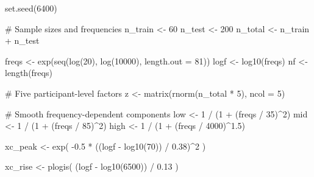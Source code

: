\documentclass[
  letterpaper,
  DIV=11,
  numbers=noendperiod]{scrreprt}
\newenvironment{Shaded}{\begin{snugshade}}{\end{snugshade}}
\newcommand{\AttributeTok}[1]{\textcolor[rgb]{0.40,0.45,0.13}{#1}}
\newcommand{\CommentTok}[1]{\textcolor[rgb]{0.37,0.37,0.37}{#1}}
\newcommand{\DecValTok}[1]{\textcolor[rgb]{0.68,0.00,0.00}{#1}}
\newcommand{\FloatTok}[1]{\textcolor[rgb]{0.68,0.00,0.00}{#1}}
\newcommand{\FunctionTok}[1]{\textcolor[rgb]{0.28,0.35,0.67}{#1}}
\newcommand{\NormalTok}[1]{\textcolor[rgb]{0.00,0.23,0.31}{#1}}
\newcommand{\OtherTok}[1]{\textcolor[rgb]{0.00,0.23,0.31}{#1}}
\newcommand{\SpecialCharTok}[1]{\textcolor[rgb]{0.37,0.37,0.37}{#1}}
\begin{document}
\begin{Shaded}
\begin{Highlighting}[]
\FunctionTok{set.seed}\NormalTok{(}\DecValTok{6400}\NormalTok{)}

\CommentTok{\# Sample sizes and frequencies}
\NormalTok{n\_train }\OtherTok{\textless{}{-}} \DecValTok{60}
\NormalTok{n\_test }\OtherTok{\textless{}{-}} \DecValTok{200}
\NormalTok{n\_total }\OtherTok{\textless{}{-}}\NormalTok{ n\_train }\SpecialCharTok{+}\NormalTok{ n\_test}

\NormalTok{freqs }\OtherTok{\textless{}{-}} \FunctionTok{exp}\NormalTok{(}\FunctionTok{seq}\NormalTok{(}\FunctionTok{log}\NormalTok{(}\DecValTok{20}\NormalTok{), }\FunctionTok{log}\NormalTok{(}\DecValTok{10000}\NormalTok{), }\AttributeTok{length.out =} \DecValTok{81}\NormalTok{))}
\NormalTok{logf }\OtherTok{\textless{}{-}} \FunctionTok{log10}\NormalTok{(freqs)}
\NormalTok{nf }\OtherTok{\textless{}{-}} \FunctionTok{length}\NormalTok{(freqs)}

\CommentTok{\# Five participant{-}level factors}
\NormalTok{z }\OtherTok{\textless{}{-}} \FunctionTok{matrix}\NormalTok{(}\FunctionTok{rnorm}\NormalTok{(n\_total }\SpecialCharTok{*} \DecValTok{5}\NormalTok{), }\AttributeTok{ncol =} \DecValTok{5}\NormalTok{)}

\CommentTok{\# Smooth frequency{-}dependent components}
\NormalTok{low }\OtherTok{\textless{}{-}} \DecValTok{1} \SpecialCharTok{/}\NormalTok{ (}\DecValTok{1} \SpecialCharTok{+}\NormalTok{ (freqs }\SpecialCharTok{/} \DecValTok{35}\NormalTok{)}\SpecialCharTok{\^{}}\DecValTok{2}\NormalTok{)}
\NormalTok{mid }\OtherTok{\textless{}{-}} \DecValTok{1} \SpecialCharTok{/}\NormalTok{ (}\DecValTok{1} \SpecialCharTok{+}\NormalTok{ (freqs }\SpecialCharTok{/} \DecValTok{85}\NormalTok{)}\SpecialCharTok{\^{}}\DecValTok{2}\NormalTok{)}
\NormalTok{high }\OtherTok{\textless{}{-}} \DecValTok{1} \SpecialCharTok{/}\NormalTok{ (}\DecValTok{1} \SpecialCharTok{+}\NormalTok{ (freqs }\SpecialCharTok{/} \DecValTok{4000}\NormalTok{)}\SpecialCharTok{\^{}}\FloatTok{1.5}\NormalTok{)}

\NormalTok{xc\_peak }\OtherTok{\textless{}{-}} \FunctionTok{exp}\NormalTok{(}
  \SpecialCharTok{{-}}\FloatTok{0.5} \SpecialCharTok{*}\NormalTok{ ((logf }\SpecialCharTok{{-}} \FunctionTok{log10}\NormalTok{(}\DecValTok{70}\NormalTok{)) }\SpecialCharTok{/} \FloatTok{0.38}\NormalTok{)}\SpecialCharTok{\^{}}\DecValTok{2}
\NormalTok{)}

\NormalTok{xc\_rise }\OtherTok{\textless{}{-}} \FunctionTok{plogis}\NormalTok{(}
\NormalTok{  (logf }\SpecialCharTok{{-}} \FunctionTok{log10}\NormalTok{(}\DecValTok{6500}\NormalTok{)) }\SpecialCharTok{/} \FloatTok{0.13}
\NormalTok{)}


\end{Highlighting}
\end{Shaded}
\end{document}
